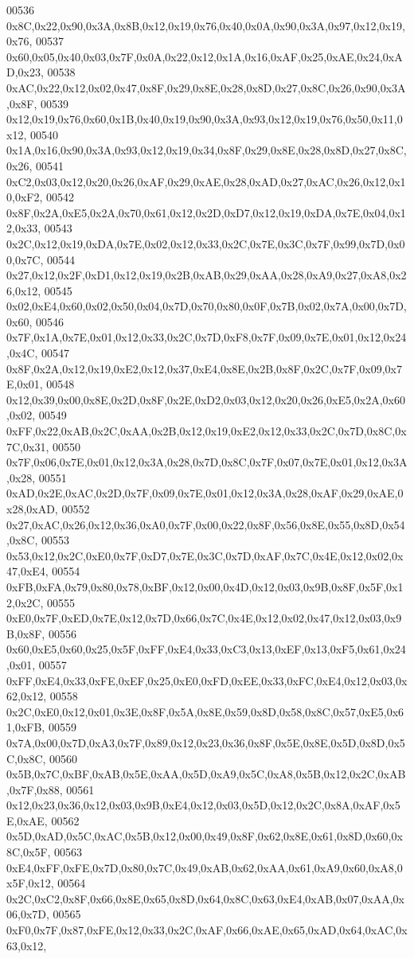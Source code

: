 \begin{DoxyCode}
00536 0x8C,0x22,0x90,0x3A,0x8B,0x12,0x19,0x76,0x40,0x0A,0x90,0x3A,0x97,0x12,0x19,0x76,
00537 0x60,0x05,0x40,0x03,0x7F,0x0A,0x22,0x12,0x1A,0x16,0xAF,0x25,0xAE,0x24,0xAD,0x23,
00538 0xAC,0x22,0x12,0x02,0x47,0x8F,0x29,0x8E,0x28,0x8D,0x27,0x8C,0x26,0x90,0x3A,0x8F,
00539 0x12,0x19,0x76,0x60,0x1B,0x40,0x19,0x90,0x3A,0x93,0x12,0x19,0x76,0x50,0x11,0x12,
00540 0x1A,0x16,0x90,0x3A,0x93,0x12,0x19,0x34,0x8F,0x29,0x8E,0x28,0x8D,0x27,0x8C,0x26,
00541 0xC2,0x03,0x12,0x20,0x26,0xAF,0x29,0xAE,0x28,0xAD,0x27,0xAC,0x26,0x12,0x10,0xF2,
00542 0x8F,0x2A,0xE5,0x2A,0x70,0x61,0x12,0x2D,0xD7,0x12,0x19,0xDA,0x7E,0x04,0x12,0x33,
00543 0x2C,0x12,0x19,0xDA,0x7E,0x02,0x12,0x33,0x2C,0x7E,0x3C,0x7F,0x99,0x7D,0x00,0x7C,
00544 0x27,0x12,0x2F,0xD1,0x12,0x19,0x2B,0xAB,0x29,0xAA,0x28,0xA9,0x27,0xA8,0x26,0x12,
00545 0x02,0xE4,0x60,0x02,0x50,0x04,0x7D,0x70,0x80,0x0F,0x7B,0x02,0x7A,0x00,0x7D,0x60,
00546 0x7F,0x1A,0x7E,0x01,0x12,0x33,0x2C,0x7D,0xF8,0x7F,0x09,0x7E,0x01,0x12,0x24,0x4C,
00547 0x8F,0x2A,0x12,0x19,0xE2,0x12,0x37,0xE4,0x8E,0x2B,0x8F,0x2C,0x7F,0x09,0x7E,0x01,
00548 0x12,0x39,0x00,0x8E,0x2D,0x8F,0x2E,0xD2,0x03,0x12,0x20,0x26,0xE5,0x2A,0x60,0x02,
00549 0xFF,0x22,0xAB,0x2C,0xAA,0x2B,0x12,0x19,0xE2,0x12,0x33,0x2C,0x7D,0x8C,0x7C,0x31,
00550 0x7F,0x06,0x7E,0x01,0x12,0x3A,0x28,0x7D,0x8C,0x7F,0x07,0x7E,0x01,0x12,0x3A,0x28,
00551 0xAD,0x2E,0xAC,0x2D,0x7F,0x09,0x7E,0x01,0x12,0x3A,0x28,0xAF,0x29,0xAE,0x28,0xAD,
00552 0x27,0xAC,0x26,0x12,0x36,0xA0,0x7F,0x00,0x22,0x8F,0x56,0x8E,0x55,0x8D,0x54,0x8C,
00553 0x53,0x12,0x2C,0xE0,0x7F,0xD7,0x7E,0x3C,0x7D,0xAF,0x7C,0x4E,0x12,0x02,0x47,0xE4,
00554 0xFB,0xFA,0x79,0x80,0x78,0xBF,0x12,0x00,0x4D,0x12,0x03,0x9B,0x8F,0x5F,0x12,0x2C,
00555 0xE0,0x7F,0xED,0x7E,0x12,0x7D,0x66,0x7C,0x4E,0x12,0x02,0x47,0x12,0x03,0x9B,0x8F,
00556 0x60,0xE5,0x60,0x25,0x5F,0xFF,0xE4,0x33,0xC3,0x13,0xEF,0x13,0xF5,0x61,0x24,0x01,
00557 0xFF,0xE4,0x33,0xFE,0xEF,0x25,0xE0,0xFD,0xEE,0x33,0xFC,0xE4,0x12,0x03,0x62,0x12,
00558 0x2C,0xE0,0x12,0x01,0x3E,0x8F,0x5A,0x8E,0x59,0x8D,0x58,0x8C,0x57,0xE5,0x61,0xFB,
00559 0x7A,0x00,0x7D,0xA3,0x7F,0x89,0x12,0x23,0x36,0x8F,0x5E,0x8E,0x5D,0x8D,0x5C,0x8C,
00560 0x5B,0x7C,0xBF,0xAB,0x5E,0xAA,0x5D,0xA9,0x5C,0xA8,0x5B,0x12,0x2C,0xAB,0x7F,0x88,
00561 0x12,0x23,0x36,0x12,0x03,0x9B,0xE4,0x12,0x03,0x5D,0x12,0x2C,0x8A,0xAF,0x5E,0xAE,
00562 0x5D,0xAD,0x5C,0xAC,0x5B,0x12,0x00,0x49,0x8F,0x62,0x8E,0x61,0x8D,0x60,0x8C,0x5F,
00563 0xE4,0xFF,0xFE,0x7D,0x80,0x7C,0x49,0xAB,0x62,0xAA,0x61,0xA9,0x60,0xA8,0x5F,0x12,
00564 0x2C,0xC2,0x8F,0x66,0x8E,0x65,0x8D,0x64,0x8C,0x63,0xE4,0xAB,0x07,0xAA,0x06,0x7D,
00565 0xF0,0x7F,0x87,0xFE,0x12,0x33,0x2C,0xAF,0x66,0xAE,0x65,0xAD,0x64,0xAC,0x63,0x12,

\end{DoxyCode}
